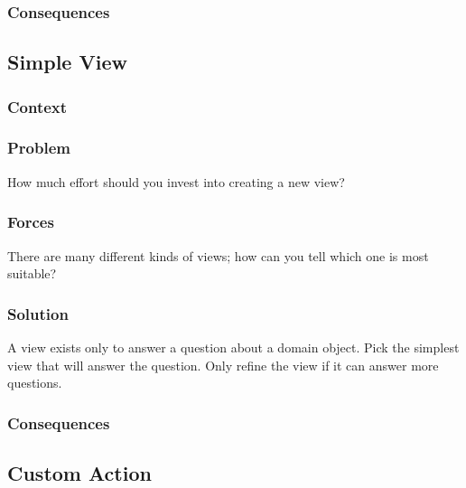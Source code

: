 \documentclass[sigconf]{acmart}
\begin{document}

\subsubsection*{Consequences}

\subsection*{Simple View}\label{pat:simpleView}
\subsubsection*{Context}
\subsubsection*{Problem}

How much effort should you invest into creating a new view?

\subsubsection*{Forces}

There are many different kinds of views; how can you tell which one is most suitable?

\subsubsection*{Solution}

A view exists only to answer a question about a domain object. Pick the simplest view that will answer the question. Only refine the view if it can answer more questions.


\subsubsection*{Consequences}

\subsection*{Custom Action}\label{pat:customAction}
\end{document}
